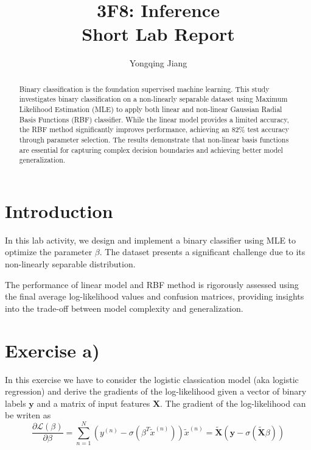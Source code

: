 \documentclass[english]{article}
\begin{document}
\title{3F8: Inference\\
 Short Lab Report}

\author{Yongqing Jiang}
\maketitle
\begin{abstract}
Binary classification is the foundation supervised 
machine learning. 
This study investigates binary classification on a 
non-linearly separable dataset using 
Maximum Likelihood Estimation (MLE)
to apply both linear and non-linear Gaussian 
Radial Basis Functions (RBF)
classifier. While the linear model 
provides a limited accuracy, 
the RBF method significantly improves performance, 
achieving an 82\% test accuracy through
parameter selection. The results demonstrate 
that non-linear basis functions are essential 
for capturing complex decision boundaries and 
achieving better model generalization.

\end{abstract}

\section{Introduction}
In this lab activity, we design and implement a 
binary classifier using MLE to 
optimize the parameter  $\beta$. 
The dataset presents a significant 
challenge due to its non-linearly 
separable distribution.
 
The performance of linear model and RBF method 
is rigorously assessed using the 
final average log-likelihood values 
and confusion matrices, providing 
insights into the trade-off between 
model complexity and generalization.

\section{Exercise a)\label{sec:Exercise-a}}

In this exercise we have to consider the logistic classication model
(aka logistic regression) and derive the gradients of the log-likelihood
given a vector of binary labels $\mathbf{y}$ and a matrix of input
features $\mathbf{X}$. The gradient of the log-likelihood can be
writen as
\begin{equation*}
   \frac{\partial\mathcal{L}(\beta)}{\partial\beta}=
   \sum_{n=1}^{N} (y^{(n)} - \sigma(\beta^T \tilde{x}^{(n)}))\tilde{x}^{(n)}
   = \tilde{\mathbf{X}} (\mathbf{y} - \sigma(\tilde{\mathbf{X}}\beta ))
\end{equation*}
\end{document}

